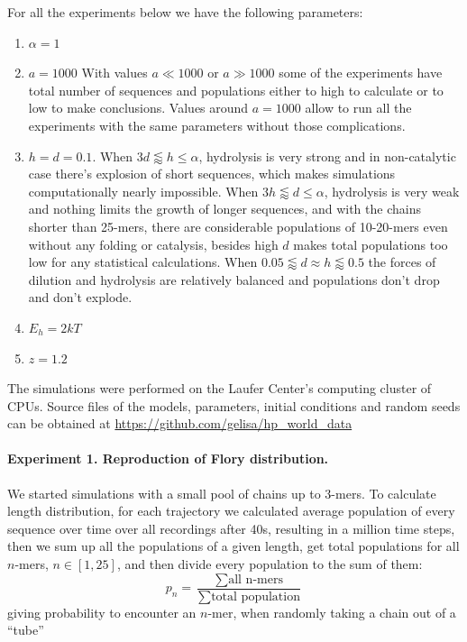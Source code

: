 \documentclass[journal=jacsat,manuscript=article,layout=twocolumn]{achemso}
\newcommand*{\ga}{\alpha}
\begin{document}
For all the experiments below we have the following parameters:
\begin{enumerate}
 \item $\ga = 1$
 \item $a=1000$
 \subitem With values $a\ll 1000\,\,\mbox{or}\,\,a\gg1000$ some of the experiments have total 
number of sequences and populations either to high to calculate or to low to make conclusions. 
Values around $a=1000$ allow to run all the experiments with the same parameters without those 
complications.
 \item $h=d=0.1$.
 \subitem When $3d\lessapprox h\leq\ga$, hydrolysis is very strong and in 
non-catalytic case there's explosion of short sequences, which makes simulations computationally 
nearly impossible. 
\subitem When $3h\lessapprox d\leq\ga$, hydrolysis is very weak and nothing limits the 
growth of longer sequences, and with the chains shorter than 25-mers, there are considerable 
populations of 10-20-mers even without any folding or catalysis, besides high $d$ makes total 
populations too low for any statistical calculations. 
\subitem When $0.05\lessapprox d\approx h \lessapprox 0.5$ the forces of dilution and hydrolysis 
are relatively balanced and populations don't drop and don't explode.
 \item $E_h = 2kT$
 \item $z=1.2$
\end{enumerate}


The simulations were performed on the Laufer Center's computing cluster of CPUs. 
Source files of the models, parameters, initial conditions and random seeds can be obtained at 
\url{https://github.com/gelisa/hp_world_data}

\paragraph{Experiment 1. Reproduction of Flory distribution.}\label{sec:expt1}
We started simulations with a small pool of chains up to 3-mers. To calculate length distribution, 
for each trajectory we calculated average population of every sequence over time over all 
recordings 
after 40s, resulting in a million time steps, then we sum up all the populations of a given 
length, 
get total populations for all $n$-mers, $n\in[1,25]$, and then divide every population to the sum 
of them:
\begin{equation}
 p_n = \frac{\sum\mbox{all n-mers}}{\sum\mbox{total population}}
\end{equation}
giving probability to encounter an $n$-mer, when randomly taking a chain out of a ``tube''
\end{document}
